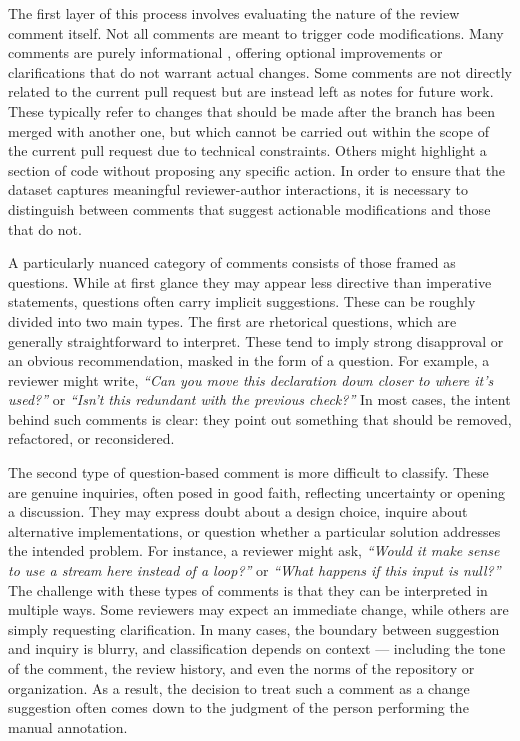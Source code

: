 The first layer of this process involves evaluating the nature of the review comment itself. Not all
comments are meant to trigger code modifications. Many comments are purely informational , offering
optional improvements or clarifications that do not warrant actual changes. Some comments are not
directly related to the current pull request but are instead left as notes for future work. These
typically refer to changes that should be made after the branch has been merged with another one,
but which cannot be carried out within the scope of the current pull request due to technical
constraints. Others might highlight a section of code without proposing any specific action. In
order to ensure that the dataset captures meaningful reviewer-author interactions, it is necessary
to distinguish between comments that suggest actionable modifications and those that do not.

A particularly nuanced category of comments consists of those framed as questions. While at first
glance they may appear less directive than imperative statements, questions often carry implicit
suggestions. These can be roughly divided into two main types. The first are rhetorical questions,
which are generally straightforward to interpret. These tend to imply strong disapproval or an
obvious recommendation, masked in the form of a question. For example, a reviewer might write,
\textit{``Can you move this declaration down closer to where it's used?''} or \textit{``Isn't this
redundant with the previous check?''} In most cases, the intent behind such comments is clear: they
point out something that should be removed, refactored, or reconsidered.

The second type of question-based comment is more difficult to classify. These are genuine
inquiries, often posed in good faith, reflecting uncertainty or opening a discussion. They may
express doubt about a design choice, inquire about alternative implementations, or question whether
a particular solution addresses the intended problem. For instance, a reviewer might ask,
\textit{“Would it make sense to use a stream here instead of a loop?”} or \textit{“What happens if
this input is null?”} The challenge with these types of comments is that they can be interpreted in
multiple ways. Some reviewers may expect an immediate change, while others are simply requesting
clarification. In many cases, the boundary between suggestion and inquiry is blurry, and
classification depends on context — including the tone of the comment, the review history, and even
the norms of the repository or organization. As a result, the decision to treat such a comment as a
change suggestion often comes down to the judgment of the person performing the manual annotation.

